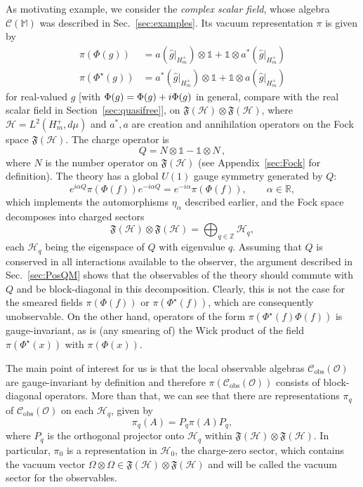 \documentclass[12pt]{article}
\let\Re\relax
\let\Im\relax
\DeclareMathOperator{\Re}{Re}
\DeclareMathOperator{\Im}{Im}
\newcommand{\1}{\mathds{1}}                         %
\newcommand{\ZZ}{\mathbb{Z}} %
\newcommand{\RR}{\mathbb{R}}           %
\newcommand{\Hcal}{\mathcal {H}}
\newcommand{\Ocal}{\mathcal{O}}
\newcommand{\fF}{\mathfrak{F}}
\newcommand{\MM}{\mathbb{M}}
\newcommand{\FF}{{\mathfrak{F}}}
\newcommand{\HH}{{\mathcal{H}}}
\newcommand{\II}{{\mathbb{1}}}
\newcommand{\Cc}{{\mathcal{C}}}
\begin{document}
As motivating example, we consider the \emph{complex scalar field}, whose algebra
$\Cc(\MM)$ was described in Sec.~\ref{sec:examples}. Its vacuum representation $\pi$ is given by
\begin{align*}
\pi(\Phi(g)) &= a(\hat{g}|_{H_m^+})\otimes \II + \II\otimes a^*(\hat{g}|_{H_m^+})\\
\pi(\Phi^\star(g)) &= a^*(\hat{g}|_{H_m^+}) \otimes \II + \II\otimes a(\hat{g}|_{H_m^+})
\end{align*}
for real-valued $g$ [with $\Phi(g)=\Phi(\Re g) + i \Phi(\Im g)$ in general, compare with the real scalar field in Section~\ref{sec:quasifree}], on $\FF(\Hcal)\otimes \FF(\Hcal)$, where $\Hcal=L^2(H^+_{m},d\mu)$ and $a^*,a$ are creation and annihilation operators on the Fock space  $\FF(\Hcal)$. The charge operator is 
\[
Q = N\otimes \II - \II \otimes N\,,
\]
where $N$ is the number operator on $\FF(\Hcal)$ (see Appendix~\ref{sec:Fock} for definition). The theory has a global $U(1)$ gauge symmetry generated by $Q$:
\begin{equation}
\label{eq:QPhi} 
e^{i\alpha Q}\pi(\Phi(f)) e^{-i\alpha Q} = e^{-i\alpha} \pi(\Phi(f)),\qquad \alpha\in\RR,
\end{equation} 
which implements the automorphisms $\eta_\alpha$ described earlier, 
and the Fock space decomposes into charged sectors
\[
\FF(\Hcal)\otimes \fF(\Hcal) = \bigoplus_{q\in\ZZ} \HH_q,
\]
each $\HH_q$ being the eigenspace of $Q$ with eigenvalue $q$. Assuming that $Q$ is conserved in all interactions available to the observer, the argument
described in Sec.~\ref{sec:PosQM} shows that the observables of the theory should commute with $Q$ and be block-diagonal in this decomposition. Clearly, this is not the case for the smeared fields $\pi(\Phi(f))$ or $\pi(\Phi^\star(f))$, which are consequently unobservable. On the other hand, operators of the form $\pi(\Phi^\star(f)\Phi(f))$ is gauge-invariant, as is (any smearing of) the Wick product of the field $\pi(\Phi^\star(x))$ with $\pi(\Phi(x))$. 

The main point of interest for us is that the local observable algebras $\Cc_{\text{obs}}(\Ocal)$ are gauge-invariant by definition and therefore $\pi(\Cc_{\text{obs}}(\Ocal))$ consists of block-diagonal operators. More than that, we can see that there are representations $\pi_q$ of $\Cc_{\text{obs}}(\Ocal)$ on each $\HH_q$, given by 
	\[
	\pi_q(A) = P_q \pi(A) P_q,
	\]
	where $P_q$ is the orthogonal projector onto $\HH_q$ within $\FF(\Hcal)\otimes \FF(\Hcal)$. In particular, $\pi_0$ is a representation in $\HH_0$, the charge-zero sector, which  contains the vacuum vector $\Omega\otimes\Omega\in\FF(\Hcal)\otimes\FF(\Hcal)$ and will be called the vacuum sector for the observables.
\end{document}
